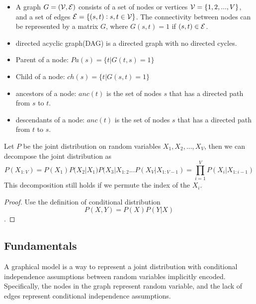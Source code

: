 \begin{refsection}
\begin{definition}\cite[309]{murphy2012machine}
	\begin{itemize}
		\item A graph $G = (\mathcal{V},\mathcal{E})$ consists of a set of nodes or vertices $\mathcal{V}=\{1,2,...,V\}$, and a set of edges $\mathcal{E}=\{(s,t):s,t\in \mathcal{V} \}$. The connectivity between nodes can be represented by a matrix $G$, where $G(s,t) = 1$ if $(s,t)\in \mathcal{E}$.
		\item directed acyclic graph(DAG) is a directed graph with no directed cycles.
		\item Parent of a node: $Pa(s) = \{t|G(t,s)=1\}$
		\item Child of a node: $ch(s) = \{t|G(s,t)=1\}$
		\item ancestors of a node: $anc(t)$ is the set of nodes $s$ that has a directed path from $s$ to $t$.
		\item descendants of a node: $anc(t)$ is the set of nodes $s$ that has a directed path from $t$ to $s$.
	\end{itemize}
\end{definition}

\begin{lemma}\label{ch:theory-of-statistics:th:jointdistributionchainrule}
	Let $P$ be the joint distribution on random variables $X_1,X_2,...,X_V$, then we can decompose the joint distribution as
	$$P(X_{1:V}) = P(X_1)P(X_2|X_1)P(X_3|X_{1:2}...P(X_V|X_{1:V-1}) = \prod_{i=1}^V P(X_i|X_{1:i-1})$$
	This decomposition still holds if we permute the index of the $X_i$.
\end{lemma}
\begin{proof}
	Use the definition of conditional distribution $$P(X,Y) = P(X)P(Y|X)$$.
\end{proof}

\subsection{Fundamentals}

\begin{definition}
	\cite[308]{murphy2012machine}A graphical model is a way to represent a joint distribution with conditional independence assumptions between random variables implicitly encoded. Specifically, the nodes in the graph represent random variable, and the lack of edges represent conditional independence assumptions.
\end{definition}


\end{refsection}
